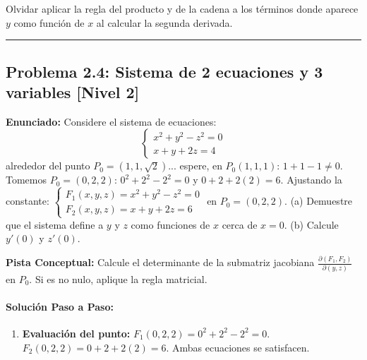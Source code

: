 \documentclass[11pt,a4paper]{article}
\begin{document}
\begin{trapbox}
Olvidar aplicar la regla del producto y de la cadena a los términos donde aparece $y$ como función de $x$ al calcular la segunda derivada.
\end{trapbox}

\vspace{0.5cm}
\hrule
\vspace{0.5cm}

\subsection*{Problema 2.4: Sistema de 2 ecuaciones y 3 variables \hfill \color{primaryblue}\small[Nivel 2]}

\begin{tcolorbox}[colback=white,colframe=gray!40,arc=1mm,boxrule=0.5pt,left=3mm,right=3mm,top=2mm,bottom=2mm]
\textbf{Enunciado:} Considere el sistema de ecuaciones:
\begin{equation*}
\begin{cases} x^2 + y^2 - z^2 = 0 \\ x + y + 2z = 4 \end{cases}
\end{equation*}
alrededor del punto $P_0 = (1, 1, \sqrt{2})$... espere, en $P_0(1,1,1)$: $1+1-1 \neq 0$. Tomemos $P_0 = (0, 2, 2)$: $0^2 + 2^2 - 2^2 = 0$ y $0 + 2 + 2(2) = 6$.
Ajustando la constante: $\begin{cases} F_1(x,y,z) = x^2 + y^2 - z^2 = 0 \\ F_2(x,y,z) = x + y + 2z = 6 \end{cases}$ en $P_0 = (0, 2, 2)$.
(a) Demuestre que el sistema define a $y$ y $z$ como funciones de $x$ cerca de $x=0$.
(b) Calcule $y'(0)$ y $z'(0)$.
\end{tcolorbox}

\begin{tcolorbox}[colback=yellow!4,colframe=accentamber!70,arc=1mm,boxrule=0.5pt,left=3mm,right=3mm,top=1.5mm,bottom=1.5mm]
\textbf{Pista Conceptual:} Calcule el determinante de la submatriz jacobiana $\frac{\partial(F_1, F_2)}{\partial(y,z)}$ en $P_0$. Si es no nulo, aplique la regla matricial.
\end{tcolorbox}

\paragraph{Solución Paso a Paso:}\par
\begin{enumerate}[label=\textbf{\arabic*.}]
\item \textbf{Evaluación del punto:}
$F_1(0,2,2) = 0^2 + 2^2 - 2^2 = 0$.
$F_2(0,2,2) = 0 + 2 + 2(2) = 6$. Ambas ecuaciones se satisfacen.
\end{enumerate}
\end{document}
